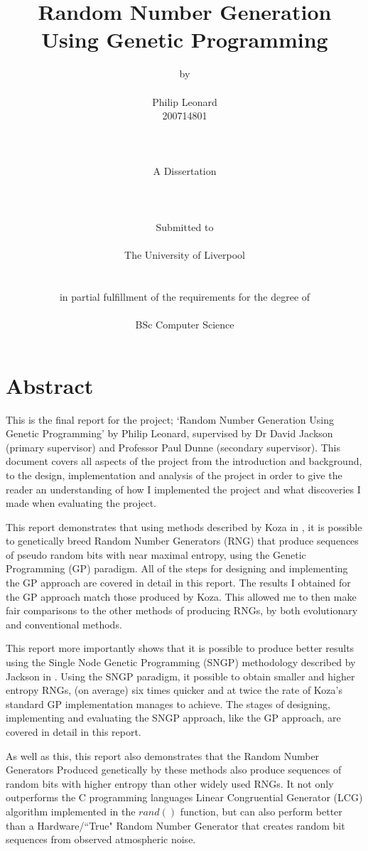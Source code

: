 \documentclass[a4paper,10.5pt]{article}
\title{Random Number Generation Using Genetic Programming}
\author{{\small by}\\\\Philip Leonard\\ 200714801 \\\\\\\\ A Dissertation \\\\\\\\ {\large Submitted to} \\\\{\Large The University of Liverpool} \\\\\\{\normalsize  in partial fulfillment of the requirements for the degree of}\\\\{\Large BSc Computer Science}}
\begin{document}
\begin{titlepage}
\maketitle
\end{titlepage}

\tableofcontents
\newpage
\listoffigures
\listoftables
\newpage
\section{Abstract}

This is the final report for the project; `Random Number Generation Using Genetic Programming' by Philip Leonard, supervised by Dr David Jackson (primary supervisor) and Professor Paul Dunne (secondary supervisor). This document covers all aspects of the project from the introduction and background, to the design, implementation and analysis of the project in order to give the reader an understanding of how I implemented the project and what discoveries I made when evaluating the project.

This report demonstrates that using methods described by Koza in \cite{kozarng}, it is possible to genetically breed Random Number Generators (RNG) that produce sequences of pseudo random bits with near maximal entropy, using the Genetic Programming (GP) paradigm. All of the steps for designing and implementing the GP approach are covered in detail in this report. The results I obtained for the GP approach match those produced by Koza. This allowed me to then make fair comparisons to the other methods of producing RNGs, by both evolutionary and conventional methods.

This report more importantly shows that it is possible to produce better results using the Single Node Genetic Programming (SNGP) methodology described by Jackson in \cite{jacksonsngp}. Using the SNGP paradigm, it possible to obtain smaller and higher entropy RNGs, (on average) six times quicker and at twice the rate of Koza's standard GP implementation manages to achieve. The stages of designing, implementing and evaluating the SNGP approach, like the GP approach, are covered in detail in this report.

As well as this, this report also demonstrates that the Random Number Generators Produced genetically by these methods also produce sequences of random bits with higher entropy than other widely used RNGs. It not only outperforms the C programming languages Linear Congruential Generator (LCG) algorithm implemented in the $rand()$ function, but can also perform better than a Hardware/``True" Random Number Generator that creates random bit sequences from observed atmospheric noise.
\end{document}
